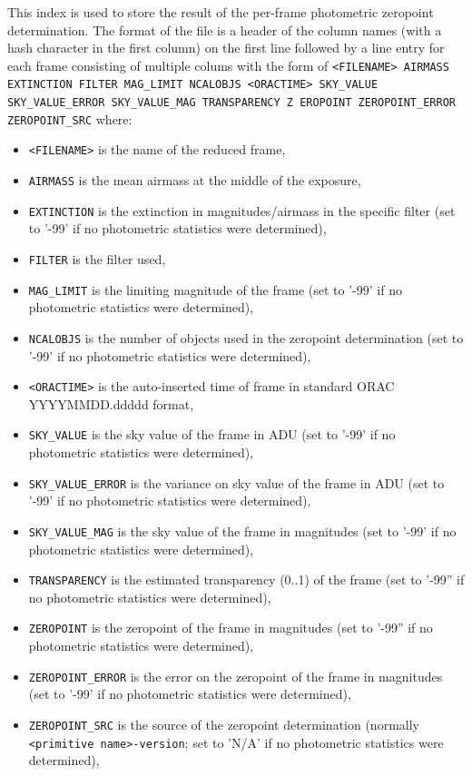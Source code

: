 \documentclass[twoside,11pt,nolof]{starlink}
\begin{document}
This index is used to store the result of the per-frame photometric zeropoint
determination. The format of the file is a header of the column names (with a hash
character in the first column) on the first line followed by a line entry for
each frame consisting of multiple colums with the form of \texttt{<FILENAME>
AIRMASS EXTINCTION FILTER MAG\_LIMIT NCALOBJS <ORACTIME> SKY\_VALUE
SKY\_VALUE\_ERROR SKY\_VALUE\_MAG TRANSPARENCY Z
EROPOINT ZEROPOINT\_ERROR ZEROPOINT\_SRC} where:
\begin{itemize}
\item \texttt{<FILENAME>} is the name of the reduced frame, 
\item \texttt{AIRMASS} is the mean airmass at the middle of the exposure, 
\item \texttt{EXTINCTION} is the extinction in magnitudes/airmass in the
specific filter (set to '-99' if no photometric statistics were determined), 
\item \texttt{FILTER} is the filter used,
\item \texttt{MAG\_LIMIT} is the limiting magnitude of the frame (set to '-99' if no photometric statistics were determined), 
\item \texttt{NCALOBJS} is the number of objects used in the zeropoint
determination (set to '-99' if no photometric statistics were determined), 
\item \texttt{<ORACTIME>} is the auto-inserted time of frame in standard ORAC
YYYYMMDD.ddddd format,
\item \texttt{SKY\_VALUE} is the sky value of the frame in ADU (set to '-99' if no photometric statistics were determined), 
\item \texttt{SKY\_VALUE\_ERROR} is the variance on sky value of the frame in ADU (set to '-99' if no photometric statistics were determined), 
\item \texttt{SKY\_VALUE\_MAG} is the sky value of the frame in magnitudes (set to '-99' if no photometric statistics were determined), 
\item \texttt{TRANSPARENCY} is the estimated transparency (0..1) of the frame
(set to '-99'' if no photometric statistics were determined),
\item \texttt{ZEROPOINT} is the zeropoint of the frame in magnitudes
(set to '-99'' if no photometric statistics were determined),
\item \texttt{ZEROPOINT\_ERROR} is the error on the zeropoint of the frame in magnitudes
(set to '-99' if no photometric statistics were determined),
\item \texttt{ZEROPOINT\_SRC} is the source of the zeropoint determination
(normally \texttt{<primitive name>-version}; set to 'N/A' if no photometric statistics were determined),
\end{itemize}
\end{document}
